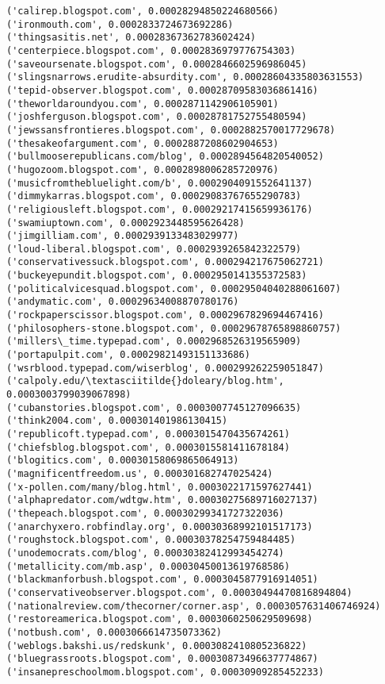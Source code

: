 \documentclass[11pt]{article}
\begin{document}
\begin{Verbatim}[commandchars=\\\{\}]
('calirep.blogspot.com', 0.00028294850224680566)
('ironmouth.com', 0.0002833724673692286)
('thingsasitis.net', 0.00028367362783602424)
('centerpiece.blogspot.com', 0.0002836979776754303)
('saveoursenate.blogspot.com', 0.0002846602596986045)
('slingsnarrows.erudite-absurdity.com', 0.00028604335803631553)
('tepid-observer.blogspot.com', 0.00028709583036861416)
('theworldaroundyou.com', 0.0002871142906105901)
('joshferguson.blogspot.com', 0.00028781752755480594)
('jewssansfrontieres.blogspot.com', 0.0002882570017729678)
('thesakeofargument.com', 0.0002887208602904653)
('bullmooserepublicans.com/blog', 0.0002894564820540052)
('hugozoom.blogspot.com', 0.0002898006285720976)
('musicfromthebluelight.com/b', 0.0002904091552641137)
('dimmykarras.blogspot.com', 0.00029083767655290783)
('religiousleft.blogspot.com', 0.00029217415659936176)
('swamiuptown.com', 0.0002923448595626428)
('jimgilliam.com', 0.0002939133483029977)
('loud-liberal.blogspot.com', 0.0002939265842322579)
('conservativessuck.blogspot.com', 0.000294217675062721)
('buckeyepundit.blogspot.com', 0.0002950141355372583)
('politicalvicesquad.blogspot.com', 0.00029504040288061607)
('andymatic.com', 0.00029634008870780176)
('rockpaperscissor.blogspot.com', 0.0002967829694467416)
('philosophers-stone.blogspot.com', 0.00029678765898860757)
('millers\_time.typepad.com', 0.0002968526319565909)
('portapulpit.com', 0.00029821493151133686)
('wsrblood.typepad.com/wiserblog', 0.000299262259051847)
('calpoly.edu/\textasciitilde{}doleary/blog.htm', 0.0003003799039067898)
('cubanstories.blogspot.com', 0.0003007745127096635)
('think2004.com', 0.000301401986130415)
('republicoft.typepad.com', 0.0003015470435674261)
('chiefsblog.blogspot.com', 0.0003015581411678184)
('blogitics.com', 0.00030158069865064913)
('magnificentfreedom.us', 0.000301682747025424)
('x-pollen.com/many/blog.html', 0.0003022171597627441)
('alphapredator.com/wdtgw.htm', 0.00030275689716027137)
('thepeach.blogspot.com', 0.00030299341727322036)
('anarchyxero.robfindlay.org', 0.00030368992101517173)
('roughstock.blogspot.com', 0.00030378254759484485)
('unodemocrats.com/blog', 0.00030382412993454274)
('metallicity.com/mb.asp', 0.00030450013619768586)
('blackmanforbush.blogspot.com', 0.0003045877916914051)
('conservativeobserver.blogspot.com', 0.00030494470816894804)
('nationalreview.com/thecorner/corner.asp', 0.0003057631406746924)
('restoreamerica.blogspot.com', 0.0003060250629509698)
('notbush.com', 0.0003066614735073362)
('weblogs.bakshi.us/redskunk', 0.0003082410805236822)
('bluegrassroots.blogspot.com', 0.00030873496637774867)
('insanepreschoolmom.blogspot.com', 0.00030909285452233)

\end{Verbatim}
\end{document}
